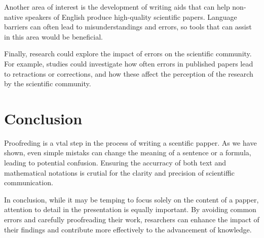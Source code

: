 \documentclass{article}
\begin{document}
Another area of interest is the development of writing aids that can help non-native speakers of English produce high-quality scientific papers. Language barriers can often lead to misunderstandings and errors, so tools that can assist in this area would be beneficial.

Finally, research could explore the impact of errors on the scientific community. For example, studies could investigate how often errors in published papers lead to retractions or corrections, and how these affect the perception of the research by the scientific community.

\section{Conclusion}
Proofreding is a vtal step in the process of writing a scentific papper. As we have shown, even simple mistaks can change the meaning of a sentence or a formula, leading to potential confusion. Ensuring the accurracy of both text and mathematical notations is crutial for the clarity and precision of scientiffic communication.

In conclusion, while it may be temping to focus solely on the content of a papper, attention to detail in the presentation is equally important. By avoiding common errors and carefully proofreading their work, resarchers can enhance the impact of their findings and contribute more effectively to the advancement of knowledge.
\end{document}
